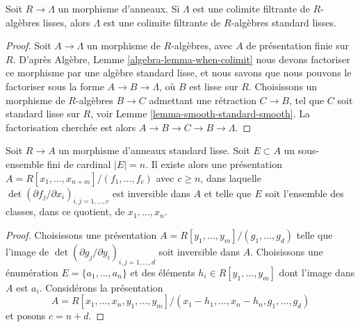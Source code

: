 \begin{lemma}
\label{lemma-colimit-standard-smooth}
Soit $R \to \Lambda$ un morphisme d'anneaux. Si $\Lambda$ est une colimite
filtrante de $R$-algèbres lisses, alors $\Lambda$ est une colimite filtrante de
$R$-algèbres standard lisses.
\end{lemma}

\begin{proof}
Soit $A \to \Lambda$ un morphisme de $R$-algèbres, avec $A$ de présentation
finie sur $R$. D'après
Algèbre, Lemme \ref{algebra-lemma-when-colimit}
nous devons factoriser ce morphisme par une algèbre standard lisse, et nous
savons que nous pouvons le factoriser sous la forme $A \to B \to \Lambda$, où
$B$ est lisse sur $R$. Choisissons un morphisme de $R$-algèbres $B \to C$
admettant une rétraction $C \to B$, tel que $C$ soit standard lisse sur $R$, voir
Lemme \ref{lemma-smooth-standard-smooth}.
La factorisation cherchée est alors $A \to B \to C \to B \to \Lambda$.
\end{proof}

\begin{lemma}
\label{lemma-standard-smooth-include-generators}
Soit $R \to A$ un morphisme d'anneaux standard lisse.
Soit $E \subset A$ un sous-ensemble fini de cardinal $|E| = n$.
Il existe alors une présentation
$A = R[x_1, \ldots, x_{n + m}]/(f_1, \ldots, f_c)$ avec $c \geq n$, dans
laquelle $\det(\partial f_j/\partial x_i)_{i, j = 1, \ldots, c}$ est inversible
dans $A$ et telle que $E$ soit l'ensemble des classes, dans ce quotient, de
$x_1, \ldots, x_n$.
\end{lemma}

\begin{proof}
Choisissons une présentation $A = R[y_1, \ldots, y_m]/(g_1, \ldots, g_d)$
telle que l'image de $\det(\partial g_j/\partial y_i)_{i, j = 1, \ldots, d}$
soit inversible dans $A$. Choisissons une énumération
$E = \{a_1, \ldots, a_n\}$ et des éléments $h_i \in R[y_1, \ldots, y_m]$ dont
l'image dans $A$ est $a_i$. Considérons la présentation
$$
A = R[x_1, \ldots, x_n, y_1, \ldots, y_m]/
(x_1 - h_1, \ldots, x_n - h_n, g_1, \ldots, g_d)
$$
et posons $c = n + d$.
\end{proof}

